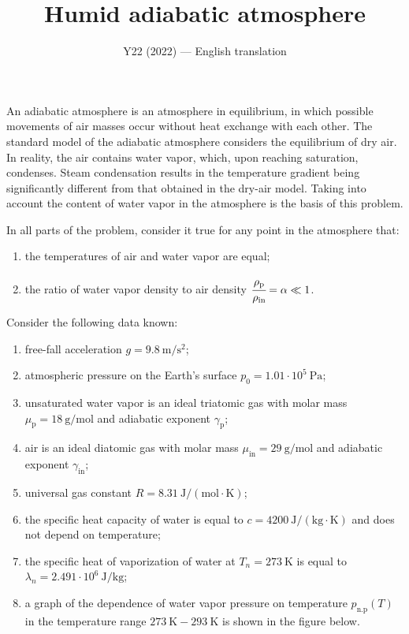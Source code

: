 \documentclass[11pt,a4paper]{article}
\title{\textbf{Humid adiabatic atmosphere}}
\author{\normalsize Y22 (2022) --- English translation}
\date{}
\begin{document}
\maketitle

An adiabatic atmosphere is an atmosphere in equilibrium, in which possible movements of air masses occur without heat exchange with each other. The standard model of the adiabatic atmosphere considers the equilibrium of dry air. In reality, the air contains water vapor, which, upon reaching saturation, condenses. Steam condensation results in the temperature gradient being significantly different from that obtained in the dry-air model. Taking into account the content of water vapor in the atmosphere is the basis of this problem.

In all parts of the problem, consider it true for any point in the atmosphere that:
\begin{enumerate}
    \item the temperatures of air and water vapor are equal;
    \item the ratio of water vapor density to air density $\cfrac{\rho_\text{p}}{\rho_\text{in}}=\alpha\ll 1$.
\end{enumerate}

Consider the following data known:
\begin{enumerate}
    \item free-fall acceleration $g=9.8~\text{m}/\text{s}^2$;
    \item atmospheric pressure on the Earth's surface $p_0=1.01\cdot 10^5~\text{Pa}$;
    \item unsaturated water vapor is an ideal triatomic gas with molar mass $\mu_\text{p}=18~\text{g}/\text{mol}$ and adiabatic exponent $\gamma_\text{p}$;
    \item air is an ideal diatomic gas with molar mass $\mu_\text{in}=29~\text{g}/\text{mol}$ and adiabatic exponent $\gamma_\text{in}$;
    \item universal gas constant $R=8.31~\text{J}/(\text{mol}\cdot\text{K})$;
    \item the specific heat capacity of water is equal to $c=4200~\text{J}/(\text{kg}\cdot\text{K})$ and does not depend on temperature;
    \item the specific heat of vaporization of water at $T_n=273~\text{K}$ is equal to $\lambda_n=2.491\cdot 10^6~\text{J}/\text{kg}$;
    \item a graph of the dependence of water vapor pressure on temperature $p_\text{n.p}(T)$ in the temperature range $273~\text{K} - 293~\text{K}$ is shown in the figure below.
\end{enumerate}
\end{document}
